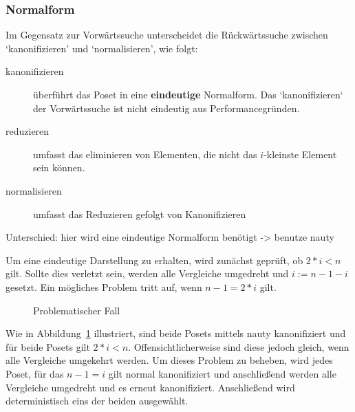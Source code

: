 \documentclass[10pt,journal,compsoc]{IEEEtran}
\begin{document}
\subsubsection{Normalform}
Im Gegensatz zur Vorwärtssuche unterscheidet die Rückwärtssuche zwischen `kanonifizieren' und `normalisieren', wie folgt:
\begin{description}
  \item[kanonifizieren]
        überführt das Poset in eine \textbf{eindeutige} Normalform.
        Das `kanonifizieren` der Vorwärtssuche ist nicht eindeutig aus Performancegründen.
  \item[reduzieren]
        umfasst das eliminieren von Elementen, die nicht das $i$-kleinste Element sein können.
  \item[normalisieren]
        umfasst das Reduzieren gefolgt von Kanonifizieren
\end{description}

Unterschied: hier wird eine eindeutige Normalform benötigt
-> benutze nauty

Um eine eindeutige Darstellung zu erhalten, wird zunächst geprüft, ob $2 * i < n$ gilt.
Sollte dies verletzt sein, werden alle Vergleiche umgedreht und $i := n - 1 - i$ gesetzt.
Ein mögliches Problem tritt auf, wenn $n - 1 = 2 * i$ gilt.
\begin{figure}
  \centering
  \caption{Problematischer Fall}
  \label{fig:backward_canonify_problematic}
\end{figure}
Wie in Abbildung~\ref{fig:backward_canonify_problematic} illustriert, sind beide Posets mittels nauty kanonifiziert und für beide Posets gilt  $2 * i < n$.
Offensichtlicherweise sind diese jedoch gleich, wenn alle Vergleiche umgekehrt werden.
Um dieses Problem zu beheben, wird jedes Poset, für das $n - 1 = i$ gilt normal kanonifiziert und anschließend werden alle Vergleiche umgedreht und es erneut kanonifiziert.
Anschließend wird deterministisch eins der beiden ausgewählt.
\end{document}
